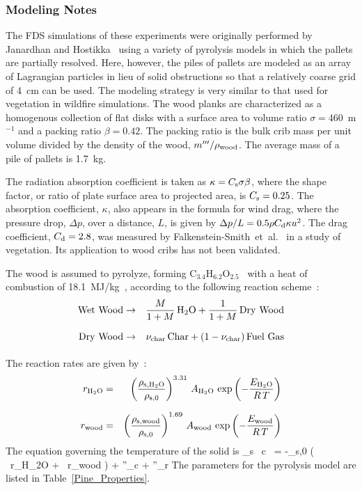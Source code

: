 \subsubsection{Modeling Notes}

The FDS simulations of these experiments were originally performed by Janardhan and Hostikka~\cite{Janardhan:FT2019,Janardhan:FSJ2021} using a variety of pyrolysis models in which the pallets are partially resolved. Here, however, the piles of pallets are modeled as an array of Lagrangian particles in lieu of solid obstructions so that a relatively coarse grid of 4~cm can be used. The modeling strategy is very similar to that used for vegetation in wildfire simulations. The wood planks are characterized as a homogenous collection of flat disks with a surface area to volume ratio $\sigma=460$~m$^{-1}$ and a packing ratio $\beta=0.42$. The packing ratio is the bulk crib mass per unit volume divided by the density of the wood, $m'''/\rho_{\rm wood}$. The average mass of a pile of pallets is 1.7~kg.

The radiation absorption coefficient is taken as $\kappa=C_{\rm s} \sigma \beta$, where the shape factor, or ratio of plate surface area to projected area, is $C_{\rm s}=0.25$. The absorption coefficient, $\kappa$, also appears in the formula for wind drag, where the pressure drop, $\Delta p$, over a distance, $L$, is given by $\Delta p / L = 0.5 \rho C_{\rm d} \kappa u^2$. The drag coefficient, $C_{\rm d}=2.8$, was measured by Falkenstein-Smith~et~al.~\cite{Falkenstein-Smith:2018} in a study of vegetation. Its application to wood cribs has not been validated.

The wood is assumed to pyrolyze, forming C$_{3.4}$H$_{6.2}$O$_{2.5}$~\cite{Ritchie:1} with a heat of combustion of 18.1~MJ/kg~\cite{Hansen:2010}, according to the following reaction scheme~\cite{Janardhan:FSJ2021}:
\begin{eqnarray}
 {\rm Wet\ Wood} & \rightarrow & \frac{M}{1+M} \, {\rm H_2O} + \frac{1}{1+M} \, {\rm Dry\ Wood} \\[.1in]
 {\rm Dry\ Wood} & \rightarrow & \nu_{\rm char} \, {\rm Char} + (1-\nu_{\rm char}) \, {\rm Fuel\ Gas} \\[.1in]
\end{eqnarray}
The reaction rates are given by~\cite{Janardhan:FSJ2021}:
\begin{eqnarray}
  r_{\rm H_2O} &=& \left( \frac{\rho_{\rm s,H_2O}}{\rho_{\rm s,0}} \right)^{3.31} \, A_{\rm H_2O} \, \exp \left( -\frac{E_{\rm H_2O}}{R \, T} \right)  \\[.1in]
  r_{\rm wood} &=& \left( \frac{\rho_{\rm s,wood}}{\rho_{\rm s,0}} \right)^{1.69} \, A_{\rm wood} \, \exp \left( -\frac{E_{\rm wood}}{R \, T} \right)
\end{eqnarray}
The equation governing the temperature of the solid is
\be
\rho_{\rm s} \, c \,  = -\rho_{\rm s,0} \left( \ r_{\rm H_2O} + \ r_{\rm wood} \right) + \nabla {}''_{\rm c}  +  \nabla {}''_{\rm r}
\ee
The parameters for the pyrolysis model are listed in Table~\ref{Pine_Properties}.

